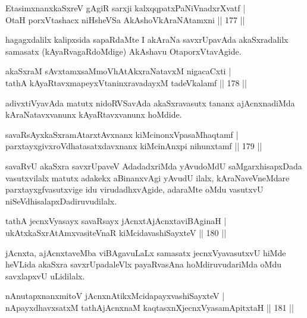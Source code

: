 \begin{shl}
EtasimxnanxkaSxreV gAgiR sarxji kalxqqpatxPaNiVnadxrXvatf |\\
OtaH porxVtashacx niHsheVSa AkAshoV\s kAraNAtamxni \hfill || 177 ||
\end{shl}

\begin{artha}
hagagxdalilx kalipxsida sapaRdaMte I akAraNa savxrUpavAda akaSxradalilx samasatx (kAyaRvagaRdoMdige) AkAshavu OtaporxVtavAgide.
\end{artha}

\begin{shl}
akaSxraM sAvxtamxsaMmoVhAtAkxraNatavxM nigacaCxti |\\
tathA kAyaRtavxmapeyxVtaninxravadayxM tadeVkalamf \hfill || 178 ||
\end{shl}

\begin{artha}
adivxtiVyavAda matutx nidoRVSavAda akaSxravasutx tananx ajAcnxnadiMda kAraNatavxvanunx kAyaRtavxvanunx hoMdide.
\end{artha}

\begin{shl}
savaRsAyxkaSxramAtarxtAvxnanx kiMcinonxVpasaMhaqtamf |\\
parxtayxgivxroVdhatasatxdavxnanx kiMcinAnxpi nihunxtamf \hfill || 179 ||
\end{shl}

\begin{artha}
savaRvU akaSxra savxrUpaveV AdadadxriMda yAvudoMdU saMgarxhisapxDada vasutx\-vilalx matutx adakekx aBinanxvAgi yAvudU ilalx, kAraNaveVneMdare parxtayxgfvasutxvige idu virudadhxvAgide, adaraMte oMdu vasutxvU niSeVdhisalapxDadiruvudilalx.
\end{artha}%

\begin{shl}
tathA jecnxVyasayx savaRsayx jAcnxtAjAcnxtaviBAginaH |\\
ukAtxkaSxrAtAmxvasiteVnaR kiMcidavashiSayxteV \hfill || 180 ||
\end{shl}

\begin{artha}
jAcnxta, ajAcnxtaveMba viBAgavuLaLx samasatx jecnxVyavasutxvU hiMde heVLida akaSxra savxrUpadaleVlx payaRvasAna hoMdiruvudariMda oMdu savxlapxvU uLidilalx.
\end{artha}

\begin{shl}
nAnutapxnanxmitoV jAcnxnAtikxMcidapayxvashiSayxteV |\\
nApayxdhavxsatxM tathA\s jAcnxnaM kaqtasxnXjecnxVyasamApitxtaH \hfill || 181 ||
\end{shl}


